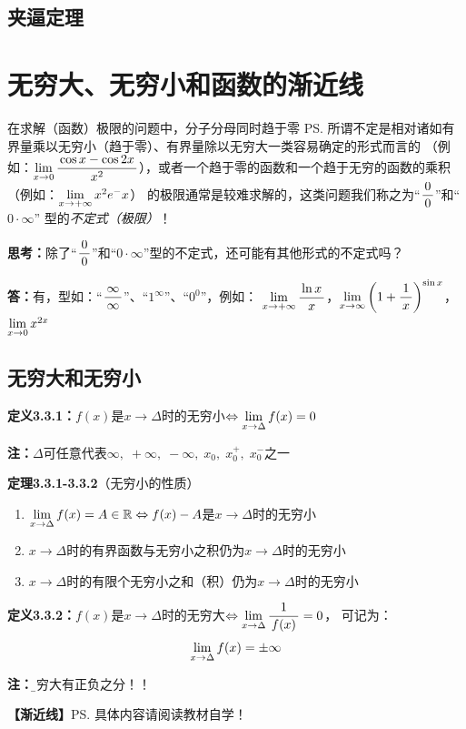 \subsection{夹逼定理}


\section{无穷大、无穷小和函数的渐近线}

在求解（函数）极限的问题中，分子分母同时趋于零
\ps{所谓不定是相对诸如有界量乘以无穷小（趋于零）、有界量除以无穷大一类容易确定的形式而言的}
（例如：$\lim\limits_{x\to{0}}\displaystyle\frac{\,{\cos
x-\cos2x}\,}{\,{x^2}\,}$），或者一个趋于零的函数和一个趋于无穷的函数的乘积（例如：$\lim\limits_{x\to{+\infty}}x^2e^-x$）
的极限通常是较难求解的，这类问题我们称之为“$\displaystyle\frac{\,{0}\,}{\,{0}\,}$”和“$0\cdot\infty$” 型的{\it 不定式（极限）}！


{\bf 思考：}除了“$\displaystyle\frac{\,{0}\,}{\,{0}\,}$”和“$0\cdot\infty$”型的不定式，还可能有其他形式的不定式吗？

{\bf 答：}有，型如：“$\displaystyle\frac{\,{\infty}\,}{\,{\infty}\,}$”、“$1^{\infty}$”、“$0^0$”，例如：
$\lim\limits_{x\to{+\infty}}\displaystyle\frac{\,{\ln x}\,}{\,{x}\,}$，$\lim\limits_{x\to{\infty}}\left(1+\displaystyle\frac{\,{1}\,}{\,{x}\,}\right)^{\sin
x}$，$\lim\limits_{x\to{0}}x^{2x}$

\subsection{无穷大和无穷小}

{\bf 定义3.3.1：}$f(x)$是$x\to\Delta$时的无穷小$\Leftrightarrow\lim\limits_{x\to{\Delta}}f(x)=0$

{\bf 注：}$\Delta$可任意代表$\infty,\;+\infty,\;-\infty,\;x_0,\;x_0^+,\;x_0^-$之一

{\bf 定理3.3.1-3.3.2}（无穷小的性质）
\begin{enumerate}[(1)]
  \setlength{\itemindent}{1cm}
  \item $\lim\limits_{x\to{\Delta}}f(x)=A\in\mathbb{R}\Leftrightarrow
  f(x)-A$是$x\to\Delta$时的无穷小
  \item $x\to\Delta$时的有界函数与无穷小之积仍为$x\to\Delta$时的无穷小
  \item $x\to\Delta$时的有限个无穷小之和（积）仍为$x\to\Delta$时的无穷小
\end{enumerate}

{\bf 定义3.3.2：}$f(x)$是$x\to\Delta$时的无穷大$\Leftrightarrow\lim\limits_{x\to{\Delta}}\displaystyle\frac{\,{1}\,}{\,{f(x)}\,}=0$，
可记为：
$$\lim\limits_{x\to{\Delta}}f(x)=\pm\infty$$

{\bf 注：}{\b 无穷大有正负之分！！}

{\bf 【渐近线】}\ps{具体内容请阅读教材自学！}

